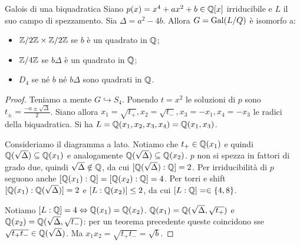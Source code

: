 \begin{theorem}{Galois di una biquadratica}
    Siano $p(x) = x^4 + ax^2 + b \in \mathbb{Q}[x]$ irriducibile e $L$ il suo campo di spezzamento. Sia $\Delta = a^2 - 4b$. Allora $G = \text{Gal}(L / Q)$ è isomorfo a:
    \begin{itemize}
        \item $\mathbb{Z}/2\mathbb{Z} \times \mathbb{Z}/2\mathbb{Z}$ se $b$ è un quadrato in $\mathbb{Q}$;
        \item $\mathbb{Z}/4\mathbb{Z}$ se $b\Delta$ è un quadrato in $\mathbb{Q}$;
        \item $D_4$ se né $b$ né $b\Delta$ sono quadrati in $\mathbb{Q}$.
    \end{itemize}
\end{theorem}
\begin{proof}
    Teniamo a mente $G \hookrightarrow S_4$.
    Ponendo $t = x^2$ le soluzioni di $p$ sono $t_{\pm} = \frac{-a \pm \sqrt{\Delta}}{2}$. Siano allora $x_1 = \sqrt{t_+}, x_2 = \sqrt{t_-}, x_3 = -x_1, x_4=-x_3$ le radici della biquadratica. Si ha $L = \mathbb{Q}(x_1,x_2,x_3,x_4)=\mathbb{Q}(x_1,x_3)$.

    \begin{minipage}{0.55\textwidth}  
    Consideriamo il diagramma a lato. Notiamo che $t_+ \in \mathbb{Q}(x_1)$ e quindi $\mathbb{Q}(\sqrt{\Delta}) \subseteq \mathbb{Q}(x_1)$ e analogamente $\mathbb{Q}(\sqrt{\Delta}) \subseteq \mathbb{Q}(x_2)$. $p$ non si spezza in fattori di grado due, quindi $\sqrt{\Delta} \notin \mathbb{Q}$, da cui $[\mathbb{Q}(\sqrt{\Delta}) : \mathbb{Q}] = 2$. Per irriducibilità di $p$ seguono anche $[\mathbb{Q}(x_1): \mathbb{Q}] = [\mathbb{Q}(x_2) :  \mathbb{Q}] = 4$. Per torri e shift $[\mathbb{Q}(x_1) : \mathbb{Q}(\sqrt{\Delta})] = 2$ e $[L : \mathbb{Q}(x_2)] \leq 2$, da cui $[L : \mathbb{Q}] = \in \{4, 8\}$.
    \end{minipage}\hfill
    \begin{minipage}{0.4\textwidth}  
    \end{minipage}\hfill

    Notiamo $[L : \mathbb{Q}] = 4 \Leftrightarrow \mathbb{Q}(x_1) = \mathbb{Q}(x_2)$. $\mathbb{Q}(x_1) = \mathbb{Q}(\sqrt{\Delta}, \sqrt{t_+})$ e $\mathbb{Q}(x_2) = \mathbb{Q}(\sqrt{\Delta}, \sqrt{t_-})$: per un teorema precedente queste coincidono sse $\sqrt{t_+ t_-} \in \mathbb{Q}(\sqrt{\Delta})$. Ma $x_1x_2 = \sqrt{t_+ t_-} = \sqrt{b}$.
    

\end{proof}
